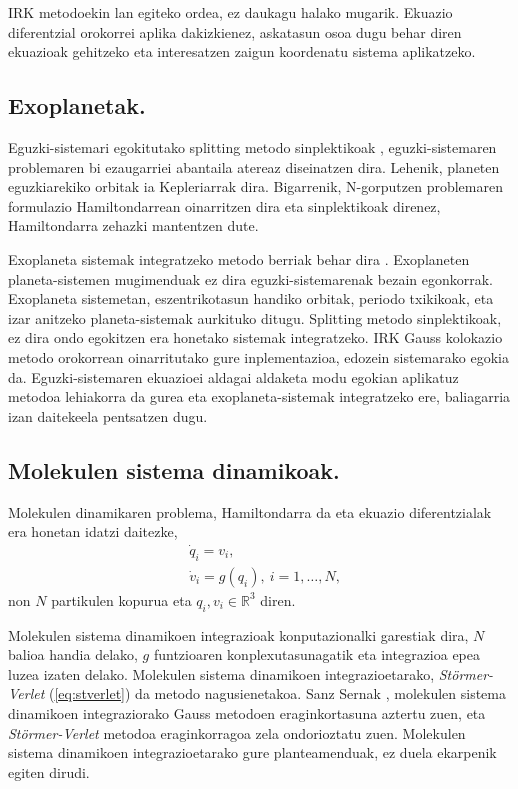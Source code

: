 IRK metodoekin lan egiteko ordea, ez daukagu halako mugarik. Ekuazio diferentzial orokorrei aplika dakizkienez, askatasun osoa dugu behar diren ekuazioak gehitzeko eta interesatzen zaigun koordenatu sistema aplikatzeko.  

\subsection*{Exoplanetak.}

Eguzki-sistemari egokitutako splitting metodo sinplektikoak \cite{Wisdom1991,Laskar2001}, eguzki-sistemaren problemaren bi ezaugarriei abantaila atereaz diseinatzen dira. Lehenik, planeten eguzkiarekiko orbitak ia Kepleriarrak dira. Bigarrenik, N-gorputzen problemaren formulazio Hamiltondarrean oinarritzen dira eta sinplektikoak direnez, Hamiltondarra zehazki mantentzen dute. 

Exoplaneta sistemak integratzeko metodo berriak behar dira \cite{Fabrycky2010}. Exoplaneten planeta-sistemen mugimenduak ez dira eguzki-sistemarenak bezain egonkorrak. Exoplaneta sistemetan, eszentrikotasun handiko orbitak, periodo txikikoak, eta izar anitzeko planeta-sistemak aurkituko ditugu. Splitting metodo sinplektikoak, ez dira ondo egokitzen era honetako sistemak integratzeko.
IRK Gauss kolokazio metodo orokorrean oinarritutako gure inplementazioa, edozein sistemarako egokia da. Eguzki-sistemaren ekuazioei aldagai aldaketa modu egokian aplikatuz metodoa lehiakorra da gurea eta exoplaneta-sistemak integratzeko ere,  baliagarria izan daitekeela pentsatzen dugu.
         
 
\subsection*{Molekulen sistema dinamikoak.}

Molekulen dinamikaren problema, Hamiltondarra da eta ekuazio diferentzialak era honetan idatzi daitezke,
\begin{align*}
&\dot{q}_i=v_i, \\
&\dot{v}_i=g(q_i), \ i=1,\dots,N,
\end{align*}
non $N$ partikulen kopurua eta $q_i,v_i \in \mathbb{R}^3$ diren.

Molekulen sistema dinamikoen integrazioak konputazionalki garestiak dira, $N$ balioa handia delako, $g$ funtzioaren konplexutasunagatik eta integrazioa epea luzea izaten delako. Molekulen sistema dinamikoen integrazioetarako, \emph{Störmer-Verlet} (\ref{eq:stverlet}) da metodo nagusienetakoa. Sanz Sernak \cite{sserna1996}, molekulen sistema dinamikoen integraziorako Gauss metodoen eraginkortasuna aztertu zuen, eta \emph{Störmer-Verlet} metodoa eraginkorragoa zela ondorioztatu zuen.
Molekulen sistema dinamikoen integrazioetarako gure planteamenduak, ez duela ekarpenik egiten dirudi. 
 

